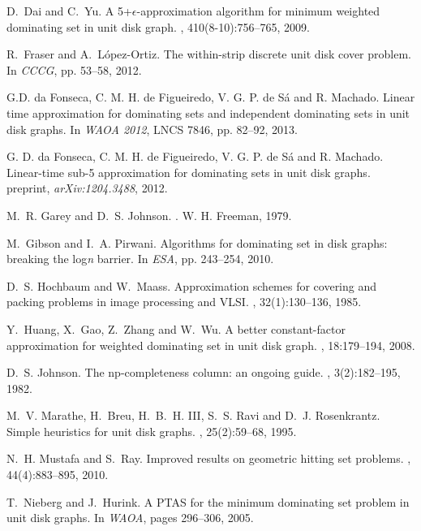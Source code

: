 \documentclass[a4paper,11pt]{article}
\begin{document}
\begin{thebibliography}{10}
D.~Dai and C.~Yu.
\newblock A 5+$\epsilon$-approximation algorithm for minimum weighted
  dominating set in unit disk graph.
, 410(8-10):756--765, 2009.

R.~Fraser and A.~L{\'o}pez-Ortiz.
\newblock The within-strip discrete unit disk cover problem.
\newblock In {\em CCCG}, pp. 53--58, 2012.

G.D. da Fonseca, C. M. H. de Figueiredo, V. G. P. de S\'{a} and R. Machado.
\newblock Linear time approximation for dominating sets and independent dominating sets in unit disk graphs.
\newblock In {\em WAOA 2012}, LNCS 7846, pp. 82--92, 2013.

G. D. da Fonseca, C. M. H. de Figueiredo, V. G. P. de S\'{a} and R. Machado.
\newblock Linear-time sub-5 approximation for dominating sets in unit disk graphs.
\newblock preprint, {\em arXiv:1204.3488}, 2012.

M.~R. Garey and D.~S. Johnson.
.
\newblock W. H. Freeman, 1979.

M.~Gibson and I.~A. Pirwani.
\newblock Algorithms for dominating set in disk graphs: breaking the log{\it n}
  barrier.
\newblock In {\em ESA}, pp. 243--254, 2010.

D.~S. Hochbaum and W.~Maass.
\newblock Approximation schemes for covering and packing problems in image
  processing and VLSI.
, 32(1):130--136, 1985.

Y.~Huang, X.~Gao, Z.~Zhang and W.~Wu.
\newblock A better constant-factor approximation for weighted dominating set in
  unit disk graph.
, 18:179--194, 2008.

D.~S. Johnson.
\newblock The np-completeness column: an ongoing guide.
, 3(2):182--195, 1982.

M.~V. Marathe, H.~Breu, H.~B.~H. III, S.~S. Ravi and D.~J. Rosenkrantz.
\newblock Simple heuristics for unit disk graphs.
, 25(2):59--68, 1995.

N.~H. Mustafa and S.~Ray.
\newblock Improved results on geometric hitting set problems.
, 44(4):883--895, 2010.

T.~Nieberg and J.~Hurink.
\newblock A PTAS for the minimum dominating set problem in unit disk graphs.
\newblock In {\em WAOA}, pages 296--306, 2005.


\end{thebibliography}
\end{document}
